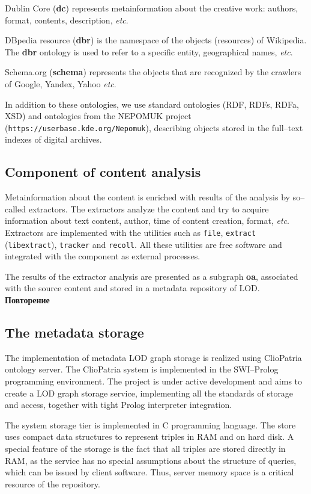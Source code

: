 \documentclass[conference,a4paper]{IEEEtran}
\providecommand\url[1]{\texttt{#1}}
\begin{document}
Dublin Core (\textbf{dc}) represents metainformation about the creative work: authors, format, contents, description, \emph{etc}.

DBpedia resource (\textbf{dbr}) is the namespace of the objects (resources) of Wikipedia.  The \textbf{dbr} ontology is used to refer to a specific entity, geographical names, \emph{etc}.

Schema.org (\textbf{schema}) represents the objects that are recognized by the crawlers of Google, Yandex, Yahoo \emph{etc}.

In addition to these ontologies, we use standard ontologies (RDF, RDFs, RDFa, XSD) and ontologies from the NEPOMUK project (\url{https://userbase.kde.org/Nepomuk}), describing objects stored in the full--text indexes of digital archives.

\subsection{Component of content analysis}

Metainformation about the content is enriched with results of the analysis by so--called extractors. The extractors analyze the content and try to acquire information about text content, author, time of content creation, format, \emph{etc}. Extractors are implemented with the utilities such as \texttt{file}, \texttt{extract} (\texttt{libextract}), \texttt{tracker} and \texttt{recoll}.  All these utilities are free software and integrated with the component as external processes.

The results of the extractor analysis are presented as a subgraph \textbf{oa}, associated with the source content and stored in a metadata repository of LOD. \textbf{Повторение}

\subsection{The metadata storage}

The implementation of metadata LOD graph storage is realized using ClioPatria \cite{b8} ontology server.  The ClioPatria system is implemented in the SWI--Prolog programming environment.  The project is under active development and aims to create a LOD graph storage service, implementing all the standards of storage and access, together with tight Prolog interpreter integration.

The system storage tier is implemented in C programming language.  The store uses compact data structures to represent triples in RAM and on hard disk.  A special feature of the storage is the fact that all triples are stored directly in RAM, as the service has no special assumptions about the structure of queries, which can be issued by client software.  Thus, server memory space is a critical resource of the repository.
\end{document}

